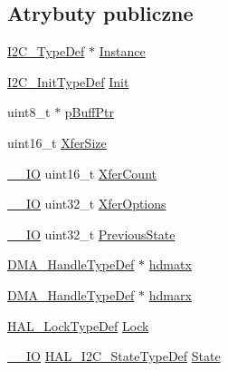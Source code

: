 \subsection*{Atrybuty publiczne}
\begin{DoxyCompactItemize}
\item 
\hyperlink{struct_i2_c___type_def}{I2\+C\+\_\+\+Type\+Def} $\ast$ \hyperlink{struct_____i2_c___handle_type_def_a080380e6051dd88c3a88c24aad4b10c0}{Instance}
\item 
\hyperlink{struct_i2_c___init_type_def}{I2\+C\+\_\+\+Init\+Type\+Def} \hyperlink{struct_____i2_c___handle_type_def_a8e665bc833889975a33b10bebeab5db2}{Init}
\item 
uint8\+\_\+t $\ast$ \hyperlink{struct_____i2_c___handle_type_def_af699cc26b19f28b9215d3d4a167f068e}{p\+Buff\+Ptr}
\item 
uint16\+\_\+t \hyperlink{struct_____i2_c___handle_type_def_a1b8a62241b4c22d97af542186cef0c39}{Xfer\+Size}
\item 
\hyperlink{core__sc300_8h_aec43007d9998a0a0e01faede4133d6be}{\+\_\+\+\_\+\+IO} uint16\+\_\+t \hyperlink{struct_____i2_c___handle_type_def_a314305a14bb912531cfc3c5f87291777}{Xfer\+Count}
\item 
\hyperlink{core__sc300_8h_aec43007d9998a0a0e01faede4133d6be}{\+\_\+\+\_\+\+IO} uint32\+\_\+t \hyperlink{struct_____i2_c___handle_type_def_a5d3ace2bbb83f44d4fe3df47fa42bb90}{Xfer\+Options}
\item 
\hyperlink{core__sc300_8h_aec43007d9998a0a0e01faede4133d6be}{\+\_\+\+\_\+\+IO} uint32\+\_\+t \hyperlink{struct_____i2_c___handle_type_def_a028d3e824c01ccc6c9a23bb5802e3313}{Previous\+State}
\item 
\hyperlink{group___d_m_a___exported___types_ga41b754a906b86bce54dc79938970138b}{D\+M\+A\+\_\+\+Handle\+Type\+Def} $\ast$ \hyperlink{struct_____i2_c___handle_type_def_ad8f3153daebc780294797b448decb190}{hdmatx}
\item 
\hyperlink{group___d_m_a___exported___types_ga41b754a906b86bce54dc79938970138b}{D\+M\+A\+\_\+\+Handle\+Type\+Def} $\ast$ \hyperlink{struct_____i2_c___handle_type_def_a52dcaac577eef13388d209f3f5a6a4b9}{hdmarx}
\item 
\hyperlink{stm32f4xx__hal__def_8h_ab367482e943333a1299294eadaad284b}{H\+A\+L\+\_\+\+Lock\+Type\+Def} \hyperlink{struct_____i2_c___handle_type_def_a96ba2c1a4eee1bbbe791b29e81c4c013}{Lock}
\item 
\hyperlink{core__sc300_8h_aec43007d9998a0a0e01faede4133d6be}{\+\_\+\+\_\+\+IO} \hyperlink{group___h_a_l__state__structure__definition_gaef355af8eab251ae2a19ee164ad81c37}{H\+A\+L\+\_\+\+I2\+C\+\_\+\+State\+Type\+Def} \hyperlink{struct_____i2_c___handle_type_def_a3421cd62d9e34c4a5ff1706916c8ae7a}{State}

\end{DoxyCompactItemize}
